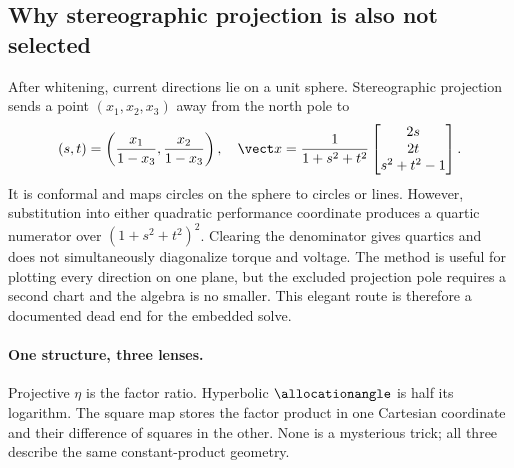 \subsection{Why stereographic projection is also not selected}

After whitening, current directions lie on a unit sphere. Stereographic
projection sends a point \((x_1,x_2,x_3)\) away from the north pole to
\begin{equation}
 (s,t)=\left(\frac{x_1}{1-x_3},\frac{x_2}{1-x_3}\right),
 \quad
 \vect x=\frac{1}{1+s^2+t^2}
 \begin{bmatrix}2s\\2t\\s^2+t^2-1\end{bmatrix}.
\end{equation}
It is conformal and maps circles on the sphere to circles or lines. However,
substitution into either quadratic performance coordinate produces a quartic
numerator over \((1+s^2+t^2)^2\). Clearing the denominator gives quartics and
does not simultaneously diagonalize torque and voltage. The method is useful
for plotting every direction on one plane, but the excluded projection pole
requires a second chart and the algebra is no smaller. This elegant route is
therefore a documented dead end for the embedded solve.

\paragraph{One structure, three lenses.}
Projective \(\eta\) is the factor ratio. Hyperbolic \(\allocationangle\) is half its
logarithm. The square map stores the factor product in one Cartesian
coordinate and their difference of squares in the other. None is a mysterious
trick; all three describe the same constant-product geometry.
